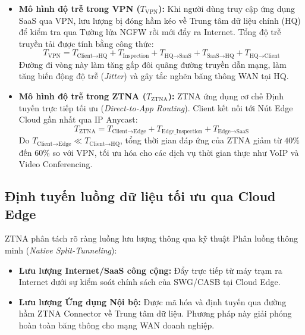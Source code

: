 \begin{itemize}
    \item \textbf{Mô hình độ trễ trong VPN ($T_{\text{VPN}}$):} Khi người dùng truy cập ứng dụng SaaS qua VPN, lưu lượng bị đóng hầm kéo về Trung tâm dữ liệu chính (HQ) để kiểm tra qua Tường lửa NGFW rồi mới đẩy ra Internet. Tổng độ trễ truyền tải được tính bằng công thức:
    \begin{equation}
        T_{\text{VPN}} = T_{\text{Client} \to \text{HQ}} + T_{\text{Inspection}} + T_{\text{HQ} \to \text{SaaS}} + T_{\text{SaaS} \to \text{HQ}} + T_{\text{HQ} \to \text{Client}}
    \end{equation}
    Đường đi vòng này làm tăng gấp đôi quãng đường truyền dẫn mạng, làm tăng biến động độ trễ (\textit{Jitter}) và gây tắc nghẽn băng thông WAN tại HQ.

    \item \textbf{Mô hình độ trễ trong ZTNA ($T_{\text{ZTNA}}$):} ZTNA ứng dụng cơ chế Định tuyến trực tiếp tối ưu (\textit{Direct-to-App Routing}). Client kết nối tới Nút Edge Cloud gần nhất qua IP Anycast:
    \begin{equation}
        T_{\text{ZTNA}} = T_{\text{Client} \to \text{Edge}} + T_{\text{Edge\_Inspection}} + T_{\text{Edge} \to \text{SaaS}}
    \end{equation}
    Do $T_{\text{Client} \to \text{Edge}} \ll T_{\text{Client} \to \text{HQ}}$, tổng thời gian đáp ứng của ZTNA giảm từ $40\%$ đến $60\%$ so với VPN, tối ưu hóa cho các dịch vụ thời gian thực như VoIP và Video Conferencing.
\end{itemize}

\subsection{Định tuyến luồng dữ liệu tối ưu qua Cloud Edge}
\label{subsec:4_3_2}

ZTNA phân tách rõ ràng luồng lưu lượng thông qua kỹ thuật Phân luồng thông minh (\textit{Native Split-Tunneling}):

\begin{itemize}
    \item \textbf{Lưu lượng Internet/SaaS công cộng:} Đẩy trực tiếp từ máy trạm ra Internet dưới sự kiểm soát chính sách của SWG/CASB tại Cloud Edge.
    \item \textbf{Lưu lượng Ứng dụng Nội bộ:} Được mã hóa và định tuyến qua đường hầm ZTNA Connector về Trung tâm dữ liệu. Phương pháp này giải phóng hoàn toàn băng thông cho mạng WAN doanh nghiệp.
\end{itemize}

